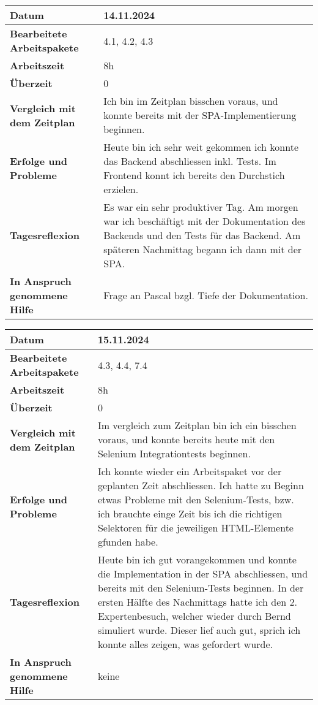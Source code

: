 \begin{longtable}{p{}|p{}}
	\hline
	\textbf{Datum}                       & 14.11.2024 \\
	\hline
	\textbf{Bearbeitete Arbeitspakete}   & 4.1, 4.2, 4.3 \\
	\hline
	\textbf{Arbeitszeit}                 & 8h \\
	\hline
	\textbf{Überzeit}                    & 0 \\
	\hline
	\textbf{Vergleich mit dem Zeitplan}  & Ich bin im Zeitplan bisschen voraus, und konnte bereits mit der SPA-Implementierung beginnen.\\
	\hline
	\textbf{Erfolge und Probleme}        & Heute bin ich sehr weit gekommen ich konnte das Backend abschliessen inkl. Tests. Im Frontend konnt ich bereits den Durchstich erzielen.
	\\
	\hline
	\textbf{Tagesreflexion}              & Es war ein sehr produktiver Tag. Am morgen war ich beschäftigt mit der Dokumentation des Backends und den Tests für das Backend. Am späteren Nachmittag begann ich dann mit der SPA.
	\\
	\hline
	\textbf{In Anspruch genommene Hilfe} & Frage an Pascal bzgl. Tiefe der Dokumentation. \\
	\hline
\end{longtable}\label{tab:arbeitsprotokoll-tag6}
\newpage

\begin{longtable}{p{}|p{}}
	\hline
	\textbf{Datum}                       & 15.11.2024 \\
	\hline
	\textbf{Bearbeitete Arbeitspakete}   & 4.3, 4.4, 7.4 \\
	\hline
	\textbf{Arbeitszeit}                 & 8h \\
	\hline
	\textbf{Überzeit}                    & 0 \\
	\hline
	\textbf{Vergleich mit dem Zeitplan}  & Im vergleich zum Zeitplan bin ich ein bisschen voraus, und konnte bereits heute mit den Selenium Integrationtests beginnen.\\
	\hline
	\textbf{Erfolge und Probleme}        & Ich konnte wieder ein Arbeitspaket vor der geplanten Zeit abschliessen. Ich hatte zu Beginn etwas Probleme mit den Selenium-Tests, bzw. ich brauchte einge Zeit bis ich die richtigen Selektoren für die jeweiligen HTML-Elemente gfunden habe.
	\\
	\hline
	\textbf{Tagesreflexion}              & Heute bin ich gut vorangekommen und konnte die Implementation in der SPA abschliessen, und bereits mit den Selenium-Tests beginnen. In der ersten Hälfte des Nachmittags hatte ich den 2. Expertenbesuch, welcher wieder durch Bernd simuliert wurde. Dieser lief auch gut, sprich ich konnte alles zeigen, was gefordert wurde.
	\\
	\hline
	\textbf{In Anspruch genommene Hilfe} & keine\\
	\hline
\end{longtable}\label{tab:arbeitsprotokoll-tag7}
\newpage

